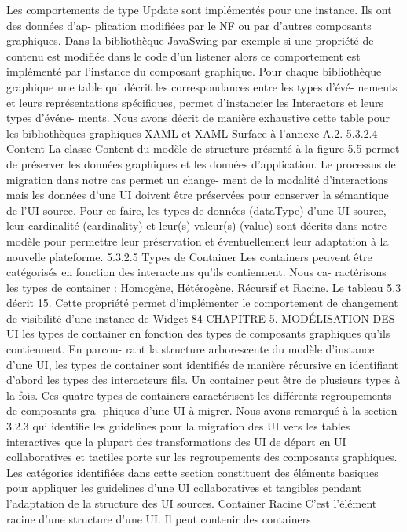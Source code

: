 \documentclass{article}
\begin{document}
Les comportements de type Update sont implémentés pour une instance. Ils ont des données d’ap-
plication modiﬁées par le NF ou par d’autres composants graphiques. Dans la bibliothèque JavaSwing
par exemple si une propriété de contenu est modiﬁée dans le code d’un listener alors ce comportement
est implémenté par l’instance du composant graphique.
Pour chaque bibliothèque graphique une table qui décrit les correspondances entre les types d’évé-
nements et leurs représentations spéciﬁques, permet d’instancier les Interactors et leurs types d’événe-
ments. Nous avons décrit de manière exhaustive cette table pour les bibliothèques graphiques XAML
et XAML Surface à l’annexe A.2.
5.3.2.4
Content
La classe Content du modèle de structure présenté à la ﬁgure 5.5 permet de préserver les données
graphiques et les données d’application. Le processus de migration dans notre cas permet un change-
ment de la modalité d’interactions mais les données d’une UI doivent être préservées pour conserver
la sémantique de l’UI source. Pour ce faire, les types de données (dataType) d’une UI source, leur
cardinalité (cardinality) et leur(s) valeur(s) (value) sont décrits dans notre modèle pour permettre leur
préservation et éventuellement leur adaptation à la nouvelle plateforme.
5.3.2.5
Types de Container
Les containers peuvent être catégorisés en fonction des interacteurs qu’ils contiennent. Nous ca-
ractérisons les types de container : Homogène, Hétérogène, Récursif et Racine. Le tableau 5.3 décrit
15. Cette propriété permet d’implémenter le comportement de changement de visibilité d’une instance de Widget
84
CHAPITRE 5. MODÉLISATION DES UI
les types de container en fonction des types de composants graphiques qu’ils contiennent. En parcou-
rant la structure arborescente du modèle d’instance d’une UI, les types de container sont identiﬁés
de manière récursive en identiﬁant d’abord les types des interacteurs ﬁls. Un container peut être de
plusieurs types à la fois.
Ces quatre types de containers caractérisent les différents regroupements de composants gra-
phiques d’une UI à migrer. Nous avons remarqué à la section 3.2.3 qui identiﬁe les guidelines pour
la migration des UI vers les tables interactives que la plupart des transformations des UI de départ en
UI collaboratives et tactiles porte sur les regroupements des composants graphiques. Les catégories
identiﬁées dans cette section constituent des éléments basiques pour appliquer les guidelines d’une UI
collaboratives et tangibles pendant l’adaptation de la structure des UI sources.
Container Racine
C’est l’élément racine d’une structure d’une UI. Il peut contenir des containers
\end{document}
